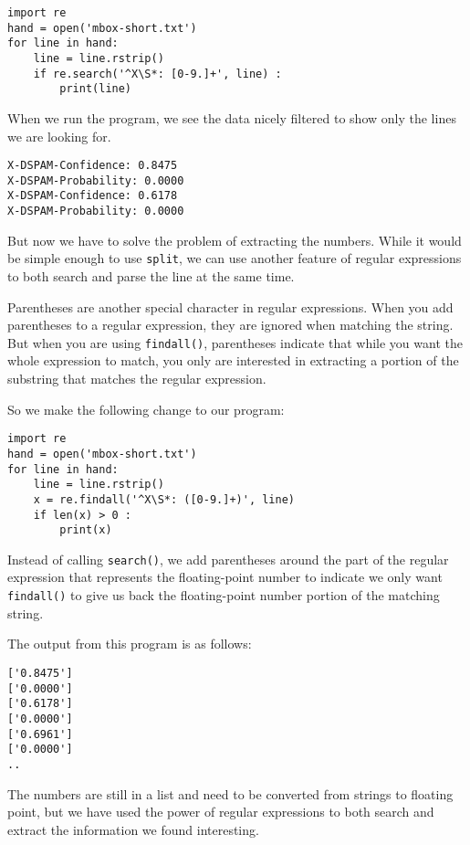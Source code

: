 \beforeverb
\begin{verbatim}
import re
hand = open('mbox-short.txt')
for line in hand:
    line = line.rstrip()
    if re.search('^X\S*: [0-9.]+', line) :
        print(line)
\end{verbatim}
\afterverb
%
When we run the program, we see the data nicely filtered to show 
only the lines we are looking for.

\beforeverb
\begin{verbatim}
X-DSPAM-Confidence: 0.8475
X-DSPAM-Probability: 0.0000
X-DSPAM-Confidence: 0.6178
X-DSPAM-Probability: 0.0000
\end{verbatim}
\afterverb
%
But now we have to solve the problem of extracting the numbers.  While it would be simple
enough to use {\tt split}, we can use another feature of regular expressions to both search
and parse the line at the same time.

Parentheses are another special character in regular expressions.  When you add parentheses
to a regular expression, they are ignored when matching the string. But when you are using
{\tt findall()}, parentheses indicate that while you want the whole expression to match,
you only are interested in extracting a portion of the substring that matches the regular
expression.  

So we make the following change to our program:

\beforeverb
\begin{verbatim}
import re
hand = open('mbox-short.txt')
for line in hand:
    line = line.rstrip()
    x = re.findall('^X\S*: ([0-9.]+)', line)
    if len(x) > 0 :
        print(x)
\end{verbatim}
\afterverb
%
Instead of calling {\tt search()}, we add parentheses around the part of the regular expression
that represents the floating-point number to indicate we only want {\tt findall()} to give us
back the floating-point number portion of the matching string.

The output from this program is as follows:

\beforeverb
\begin{verbatim}
['0.8475']
['0.0000']
['0.6178']
['0.0000']
['0.6961']
['0.0000']
..
\end{verbatim}
\afterverb
%
The numbers are still in a list and need to be converted from strings to floating point, but we
have used the power of regular expressions to both search and extract the information we found
interesting.

